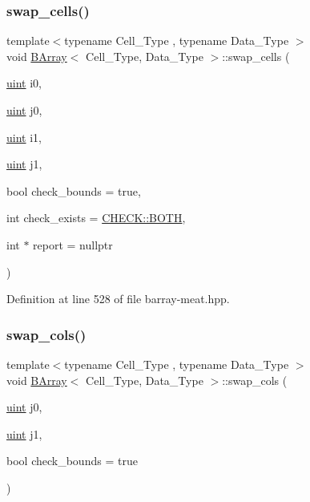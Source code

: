 \subsubsection{\texorpdfstring{swap\+\_\+cells()}{swap\_cells()}}
{\footnotesize\ttfamily template$<$typename Cell\+\_\+\+Type , typename Data\+\_\+\+Type $>$ \\
void \hyperlink{class_b_array}{B\+Array}$<$ Cell\+\_\+\+Type, Data\+\_\+\+Type $>$\+::swap\+\_\+cells (\begin{DoxyParamCaption}\item[{\hyperlink{typedefs_8hpp_a91ad9478d81a7aaf2593e8d9c3d06a14}{uint}}]{i0,  }\item[{\hyperlink{typedefs_8hpp_a91ad9478d81a7aaf2593e8d9c3d06a14}{uint}}]{j0,  }\item[{\hyperlink{typedefs_8hpp_a91ad9478d81a7aaf2593e8d9c3d06a14}{uint}}]{i1,  }\item[{\hyperlink{typedefs_8hpp_a91ad9478d81a7aaf2593e8d9c3d06a14}{uint}}]{j1,  }\item[{bool}]{check\+\_\+bounds = {\ttfamily true},  }\item[{int}]{check\+\_\+exists = {\ttfamily \hyperlink{namespace_c_h_e_c_k_a3acda1c74bfabb5b6b67e19d0ad2d52a}{C\+H\+E\+C\+K\+::\+B\+O\+TH}},  }\item[{int $\ast$}]{report = {\ttfamily nullptr} }\end{DoxyParamCaption})\hspace{0.3cm}{\ttfamily [inline]}}



Definition at line 528 of file barray-\/meat.\+hpp.

\mbox{\label{class_b_array_ae94f7e61ca5985244968d9daf2859229}} 
\subsubsection{\texorpdfstring{swap\+\_\+cols()}{swap\_cols()}}
{\footnotesize\ttfamily template$<$typename Cell\+\_\+\+Type , typename Data\+\_\+\+Type $>$ \\
void \hyperlink{class_b_array}{B\+Array}$<$ Cell\+\_\+\+Type, Data\+\_\+\+Type $>$\+::swap\+\_\+cols (\begin{DoxyParamCaption}\item[{\hyperlink{typedefs_8hpp_a91ad9478d81a7aaf2593e8d9c3d06a14}{uint}}]{j0,  }\item[{\hyperlink{typedefs_8hpp_a91ad9478d81a7aaf2593e8d9c3d06a14}{uint}}]{j1,  }\item[{bool}]{check\+\_\+bounds = {\ttfamily true} }\end{DoxyParamCaption})\hspace{0.3cm}{\ttfamily [inline]}}



